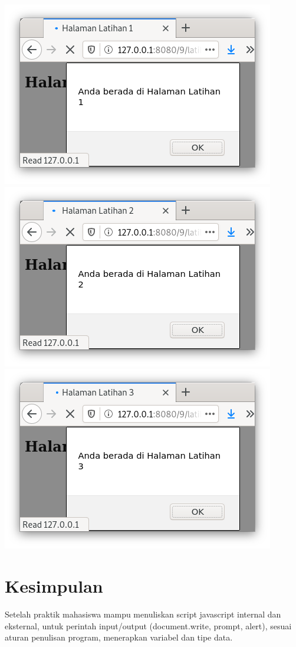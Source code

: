 \documentclass[a4paper,12pt]{article}
\begin{document}
\begin{center}
    \includegraphics[scale=.4]{5.png} \includegraphics[scale=.4]{5a.png} 
    \includegraphics[scale=.4]{5b.png} 
\end{center}

\newpage

\section{Kesimpulan}
Setelah praktik mahasiswa mampu menuliskan script javascript internal dan eksternal, untuk perintah input/output (document.write, prompt, alert), sesuai
aturan penulisan program, menerapkan variabel dan tipe data.
\end{document}

